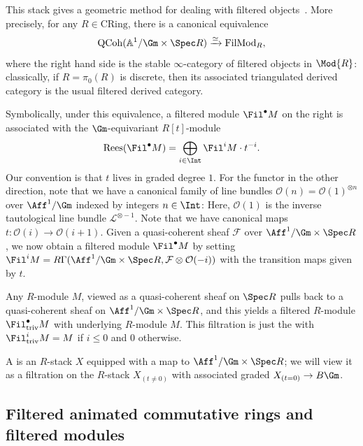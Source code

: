 \documentclass[10pt]{amsart}
\begin{document}
\subsubsection{}
This stack gives a geometric method for dealing with filtered objects~\cite{moulinos}. More precisely, for any $R\in \mathrm{CRing}$, there is a canonical equivalence 
\[
\mathrm{QCoh}(\mathbb{A}^1/\Gm\times \Spec R)\xrightarrow{\simeq}\mathrm{FilMod}_R,
\]
where the right hand side is the stable $\infty$-category of filtered objects in $\Mod{R}$: classically, if $R = \pi_0(R)$ is discrete, then its associated triangulated derived category is the usual filtered derived category.

Symbolically, under this equivalence, a filtered module $\Fil^\bullet M$ on the right is associated with the $\Gm$-equivariant $R[t]$-module
\[
\mathrm{Rees}(\Fil^\bullet M) = \bigoplus_{i\in \Int}\Fil^iM\cdot t^{-i}.
\] 
Our convention is that $t$ lives in graded degree $1$. For the functor in the other direction, note that we have a canonical family of line bundles $\mathcal{O}(n) = \mathcal{O}(1)^{\otimes n}$ over $\Aff^1/\Gm$ indexed by integers $n\in \Int$: Here, $\mathcal{O}(1)$ is the inverse tautological line bundle $\mathcal{L}^{\otimes -1}$. Note that we have canonical maps $t:\mathcal{O}(i) \to \mathcal{O}(i+1)$. Given a quasi-coherent sheaf $\mathcal{F}$ over $\Aff^1/\Gm\times \Spec R$, we now obtain a filtered module $\Fil^\bullet M$ by setting $\Fil^iM = R\Gamma(\Aff^1/\Gm\times \Spec R,\mathcal{F}\otimes \mathcal{O}(-i))$ with the transition maps given by $t$. 

\begin{definition}
Any $R$-module $M$, viewed as a quasi-coherent sheaf on $\Spec R$ pulls back to a quasi-coherent sheaf on $\Aff^1/\Gm\times \Spec R$, and this yields a filtered $R$-module $\Fil^\bullet_{\mathrm{triv}}M$ with underlying $R$-module $M$. This filtration is just the  with $\Fil^i_{\mathrm{triv}}M = M$ if $i\leq 0$ and $0$ otherwise.
\end{definition}


\begin{definition}
A  is an $R$-stack $X$ equipped with a map to $\Aff^1/\Gm\times\Spec R$; we will view it as a filtration on the $R$-stack $X_{(t\neq 0)}$ with associated graded $X_{(t=0)}\to B\Gm$.
\end{definition}


\subsection{Filtered animated commutative rings and filtered modules}
\end{document}
